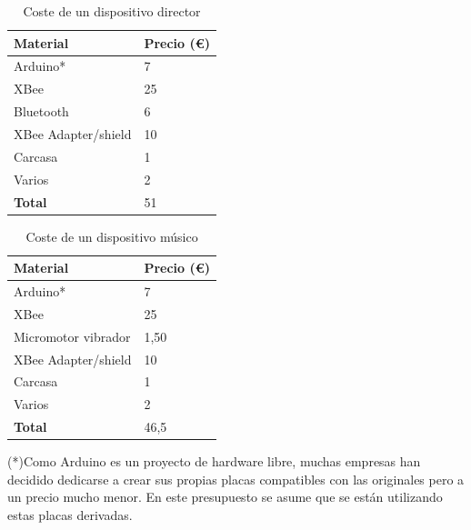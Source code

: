   \begin{table}[h]
  \centering

  \begin{tabular}{ll}
  \hline
  \rowcolor[HTML]{9698ED}
  {\bf Material}      & {\bf Precio (\euro)} \\ \hline
  Arduino*            & 7                \\
  XBee                & 25               \\
  Bluetooth           & 6                \\
  XBee Adapter/shield & 10               \\
  Carcasa             & 1                \\
  Varios              & 2                \\
  \rowcolor[HTML]{CBCEFB}
  {\bf Total}         & 51              \\ \hline
  \end{tabular}
      \caption{Coste de un dispositivo director}
      \label{table:costodirector}
  \end{table}



  \begin{table}[h]
  \centering
  \begin{tabular}{ll}
  \hline
  \rowcolor[HTML]{9698ED}
  {\bf Material}      & {\bf Precio (\euro)} \\ \hline
  Arduino*            & 7                \\
  XBee                & 25               \\
  Micromotor vibrador & 1,50             \\
  XBee Adapter/shield & 10               \\
  Carcasa             & 1                \\
  Varios              & 2                \\
  \rowcolor[HTML]{CBCEFB}
  {\bf Total}         & 46,5               \\ \hline
  \end{tabular}
    \caption{Coste de un dispositivo músico}
    \label{table:costomusico}
  \end{table}


(*)Como Arduino es un proyecto de hardware libre, muchas empresas han decidido
dedicarse a crear sus propias placas compatibles con las originales pero a un
precio mucho menor. En este presupuesto se asume que se están utilizando estas
placas derivadas.\\

